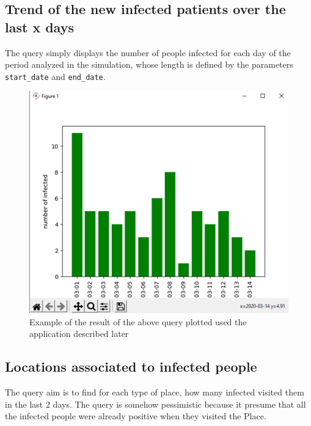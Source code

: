 \documentclass{article}
\newenvironment{code}{\captionsetup{type=listing}}{}
\begin{document}
		\subsection{Trend of the new infected patients over the last x days}
			\begin{code}
		\end{code}
		The query simply displays the number of people infected for each day of the period analyzed in the simulation, whose length is defined by the parameters \texttt{start\_date} and \texttt{end\_date}.\\
		\begin{figure}[h!]
            \centering\includegraphics[scale=0.6]{./ex_query1.png}
             \caption{Example of the result of the above query plotted used the application described later}
        \end{figure}
		
		\subsection{Locations associated to infected people}
		\begin{code}
		\end{code}
		The query aim is to find for each type of place, how many infected visited them in the last 2 days. The query is somehow pessimistic because it presume that all the infected people were already positive when they visited the Place.
\end{document}
